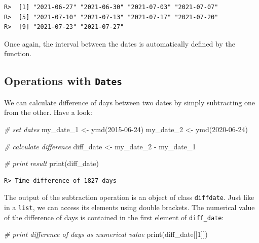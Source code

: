 \documentclass[
  12pt,
]{book}
\newenvironment{Shaded}{\begin{snugshade}}{\end{snugshade}}
\newcommand{\CommentTok}[1]{\textcolor[rgb]{0.37,0.37,0.37}{\textit{#1}}}
\newcommand{\DecValTok}[1]{\textcolor[rgb]{0.06,0.06,0.06}{#1}}
\newcommand{\FunctionTok}[1]{\textcolor[rgb]{0,0,0}{#1}}
\newcommand{\NormalTok}[1]{#1}
\newcommand{\OtherTok}[1]{\textcolor[rgb]{0.37,0.37,0.37}{#1}}
\newcommand{\SpecialCharTok}[1]{\textcolor[rgb]{0,0,0}{#1}}
\newcommand{\StringTok}[1]{\textcolor[rgb]{0.5,0.5,0.5}{#1}}
\begin{document}
\begin{verbatim}
R>  [1] "2021-06-27" "2021-06-30" "2021-07-03" "2021-07-07"
R>  [5] "2021-07-10" "2021-07-13" "2021-07-17" "2021-07-20"
R>  [9] "2021-07-23" "2021-07-27"
\end{verbatim}

Once again, the interval between the dates is automatically defined by the function.

\hypertarget{operations-with-dates}{%
\subsection{\texorpdfstring{Operations with \texttt{Dates}}{Operations with Dates}}\label{operations-with-dates}}

We can calculate difference of days between two dates by simply subtracting one from the other. Have a look:

\begin{Shaded}
\begin{Highlighting}[]
\CommentTok{\# set dates}
\NormalTok{my\_date\_1 }\OtherTok{\textless{}{-}} \FunctionTok{ymd}\NormalTok{(}\StringTok{\textquotesingle{}2015{-}06{-}24\textquotesingle{}}\NormalTok{)}
\NormalTok{my\_date\_2 }\OtherTok{\textless{}{-}} \FunctionTok{ymd}\NormalTok{(}\StringTok{\textquotesingle{}2020{-}06{-}24\textquotesingle{}}\NormalTok{)}

\CommentTok{\# calculate difference}
\NormalTok{diff\_date }\OtherTok{\textless{}{-}}\NormalTok{ my\_date\_2 }\SpecialCharTok{{-}}\NormalTok{ my\_date\_1}

\CommentTok{\# print result}
\FunctionTok{print}\NormalTok{(diff\_date)}
\end{Highlighting}
\end{Shaded}

\begin{verbatim}
R> Time difference of 1827 days
\end{verbatim}

The output of the subtraction operation is an object of class \texttt{diffdate}. Just like in a \texttt{list}, we can access its elements using double brackets. The numerical value of the difference of days is contained in the first element of \texttt{diff\_date}: 

\begin{Shaded}
\begin{Highlighting}[]
\CommentTok{\# print difference of days as numerical value}
\FunctionTok{print}\NormalTok{(diff\_date[[}\DecValTok{1}\NormalTok{]])}
\end{Highlighting}
\end{Shaded}
\end{document}
